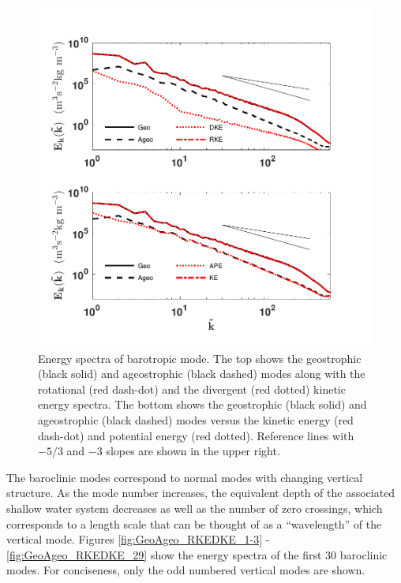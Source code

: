 \begin{figure}[H]
\vspace{-3cm}
\includegraphics[scale=1]{Chapter4/img/GeoAgeoBarotropic}
\vspace{-1cm}
\caption{Energy spectra of barotropic mode. The top shows the geostrophic (black solid) and ageostrophic (black dashed) modes along with the rotational (red dash-dot) and the divergent (red dotted) kinetic energy spectra. The bottom shows the geostrophic (black solid) and ageostrophic (black dashed) modes versus the kinetic energy (red dash-dot) and potential energy (red dotted). Reference lines with $-5/3$ and $-3$ slopes are shown in the upper right.}
\label{fig:barotropicKEPE}
\end{figure}

The baroclinic modes correspond to normal modes with changing vertical structure. As the mode number increases, the equivalent depth of the associated shallow water system decreases as well as the number of zero crossings, which corresponds to a length scale that can be thought of as a ``wavelength'' of the vertical mode. Figures \ref{fig:GeoAgeo_RKEDKE_1-3} - \ref{fig:GeoAgeo_RKEDKE_29} show the energy spectra of the first 30 baroclinic modes. For conciseness, only the odd numbered vertical modes are shown.\\

